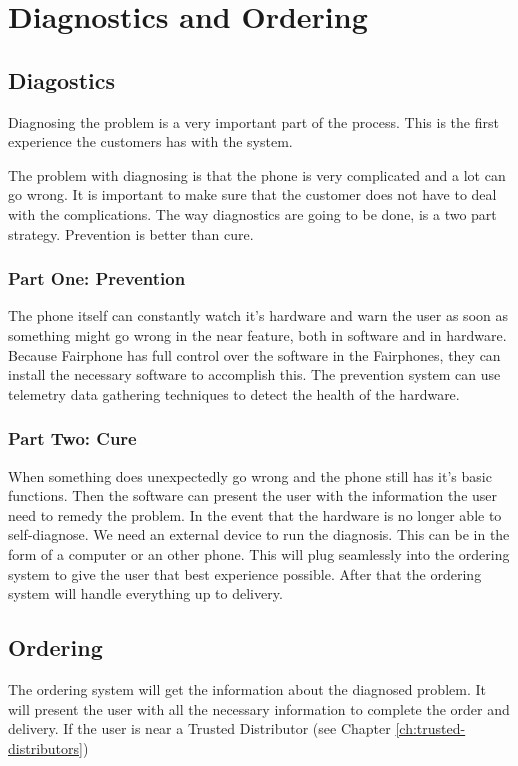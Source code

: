 \documentclass[final]{scrreprt} %
\begin{document}
\chapter{Diagnostics and Ordering} %
\label{ch:diagnostics-ordering}

\section{Diagostics}
Diagnosing the problem is a very important part of the process.
This is the first experience the customers has with the system.

The problem with diagnosing is that the phone is very complicated and a lot can go wrong.
It is important to make sure that the customer does not have to deal with the complications.
The way diagnostics are going to be done, is a two part strategy. Prevention is better than cure.

\subsection{Part One: Prevention}
The phone itself can constantly watch it's hardware and warn the user as soon as something might go wrong in the near feature, both in software and in hardware.
Because Fairphone has full control over the software in the Fairphones, they can install the necessary software to accomplish this.
The prevention system can use telemetry data gathering techniques to detect the health of the hardware.

\subsection{Part Two: Cure}
When something does unexpectedly go wrong and the phone still has it's basic functions.
Then the software can present the user with the information the user need to remedy the problem.
In the event that the hardware is no longer able to self-diagnose.
We need an external device to run the diagnosis.
This can be in the form of a computer or an other phone.
This will plug seamlessly into the ordering system to give the user that best experience possible.
After that the ordering system will handle everything up to delivery.

\section{Ordering} %
The ordering system will get the information about the diagnosed problem.
It will present the user with all the necessary information to complete the order and delivery.
If the user is near a Trusted Distributor (see Chapter \ref{ch:trusted-distributors})
\end{document}
